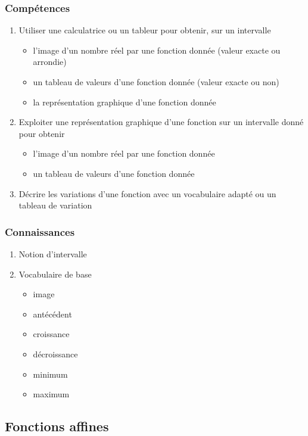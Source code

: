 \documentclass[12pt,a4paper]{article}
\begin{document}
	\subsubsection*{Compétences}
	\begin{enumerate}
		\item Utiliser une calculatrice ou un tableur pour obtenir, sur un intervalle
		\begin{itemize}
			\item l'image d'un nombre réel par une fonction donnée (valeur exacte ou arrondie)
			\item un tableau de valeurs d'une fonction donnée (valeur exacte ou non)
			\item la représentation graphique d'une fonction donnée
		\end{itemize}
		\item Exploiter une représentation graphique d'une fonction sur un intervalle donné pour obtenir
		\begin{itemize}
			\item l'image d'un nombre réel par une fonction donnée
			\item un tableau de valeurs d'une fonction donnée
		\end{itemize}
		\item Décrire les variations d'une fonction avec un vocabulaire adapté ou un tableau de variation
	\end{enumerate}
	
	\subsubsection*{Connaissances}
	\begin{enumerate}
		\item Notion d'intervalle
		\item Vocabulaire de base
		\begin{itemize}
			\item image
			\item antécédent 
			\item croissance
			\item décroissance
			\item minimum
			\item maximum
		\end{itemize}
	
	\end{enumerate}

\subsection{Fonctions affines}
\end{document}

